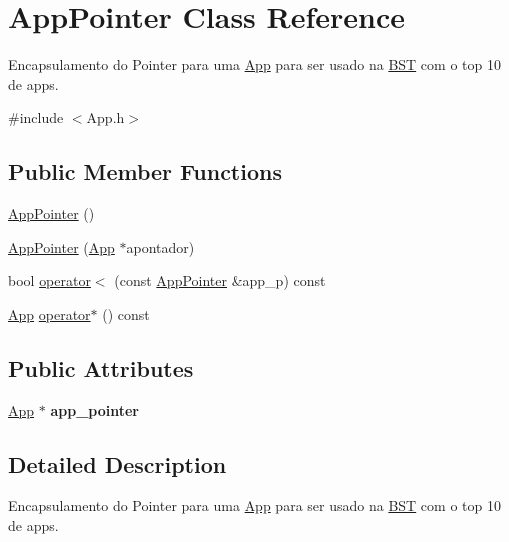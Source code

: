 \hypertarget{class_app_pointer}{\section{App\+Pointer Class Reference}
\label{class_app_pointer}
}


Encapsulamento do Pointer para uma \hyperlink{class_app}{App} para ser usado na \hyperlink{singleton_b_s_t}{B\+S\+T} com o top 10 de apps.  




{\ttfamily \#include $<$App.\+h$>$}

\subsection*{Public Member Functions}
\begin{DoxyCompactItemize}
\item 
\hyperlink{class_app_pointer_a603af9c797f92a32f6a0c7de9be279cb}{App\+Pointer} ()
\item 
\hyperlink{class_app_pointer_a2b1f6bfd847ee8fe9ecd90fc6df11464}{App\+Pointer} (\hyperlink{class_app}{App} $\ast$apontador)
\item 
bool \hyperlink{class_app_pointer_aa5f98e39b4d08189a6ae71e23c55d6a7}{operator$<$} (const \hyperlink{class_app_pointer}{App\+Pointer} \&app\+\_\+p) const 
\item 
\hyperlink{class_app}{App} \hyperlink{class_app_pointer_af46959c2d4ce452007af22b99cc94b51}{operator$\ast$} () const 
\end{DoxyCompactItemize}
\subsection*{Public Attributes}
\begin{DoxyCompactItemize}
\item 
\hypertarget{class_app_pointer_a08e6f47c0a6d2f546eabdf3a0e45eb36}{\hyperlink{class_app}{App} $\ast$ {\bfseries app\+\_\+pointer}}\label{class_app_pointer_a08e6f47c0a6d2f546eabdf3a0e45eb36}

\end{DoxyCompactItemize}


\subsection{Detailed Description}
Encapsulamento do Pointer para uma \hyperlink{class_app}{App} para ser usado na \hyperlink{singleton_b_s_t}{B\+S\+T} com o top 10 de apps. 

